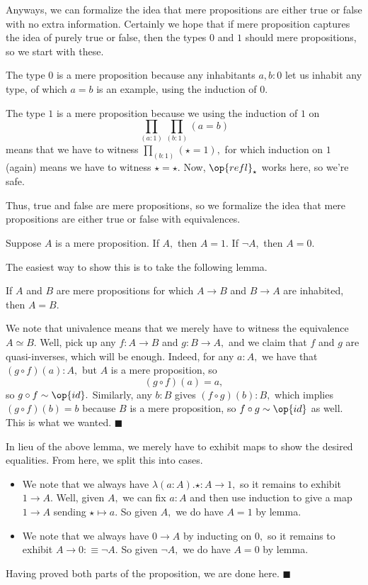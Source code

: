 Anyways, we can formalize the idea that mere propositions are either true or false with no extra information. Certainly we hope that if mere proposition captures the idea of purely true or false, then the types $0$ and $1$ should mere propositions, so we start with these.
\begin{example}
    The type $0$ is a mere proposition because any inhabitants $a,b:0$ let us inhabit any type, of which $a=b$ is an example, using the induction of $0.$
\end{example}
\begin{example}
    The type $1$ is a mere proposition because we using the induction of $1$ on
    \[\prod_{(a:1)}\prod_{(b:1)}(a=b)\]
    means that we have to witness $\prod_{(b:1)}(\star=1),$ for which induction on $1$ (again) means we have to witness $\star=\star.$ Now, $\op{refl}_\star$ works here, so we're safe.
\end{example}
Thus, true and false are mere propositions, so we formalize the idea that mere propositions are either true or false with equivalences.
\begin{proposition}
    Suppose $A$ is a mere proposition. If $A,$ then $A=1.$ If $\lnot A,$ then $A=0.$
\end{proposition}
The easiest way to show this is to take the following lemma.
\begin{lemma}
    If $A$ and $B$ are mere propositions for which $A\to B$ and $B\to A$ are inhabited, then $A=B.$
\end{lemma}
We note that univalence means that we merely have to witness the equivalence $A\simeq B.$ Well, pick up any $f:A\to B$ and $g:B\to A,$ and we claim that $f$ and $g$ are quasi-inverses, which will be enough. Indeed, for any $a:A,$ we have that $(g\circ f)(a):A,$ but $A$ is a mere proposition, so
\[(g\circ f)(a)=a,\]
so $g\circ f\sim\op{id}.$ Similarly, any $b:B$ gives $(f\circ g)(b):B,$ which implies $(g\circ f)(b)=b$ because $B$ is a mere proposition, so $f\circ g\sim\op{id}$ as well. This is what we wanted. $\blacksquare$

In lieu of the above lemma, we merely have to exhibit maps to show the desired equalities. From here, we split this into cases.
\begin{itemize}
    \item We note that we always have $\lambda(a:A).\star:A\to1,$ so it remains to exhibit $1\to A.$ Well, given $A,$ we can fix $a:A$ and then use induction to give a map $1\to A$ sending $\star\mapsto a.$ So given $A,$ we do have $A=1$ by lemma.
    \item We note that we always have $0\to A$ by inducting on $0,$ so it remains to exhibit $A\to 0:\equiv\lnot A.$ So given $\lnot A,$ we do have $A=0$ by lemma.
\end{itemize}
Having proved both parts of the proposition, we are done here. $\blacksquare$

